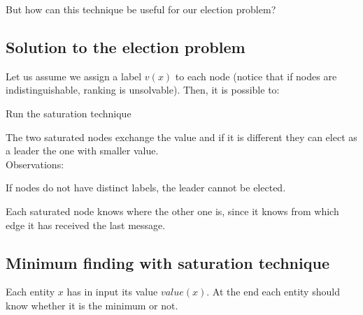 \documentclass[paper=a4, fontsize=11pt]{scrartcl} %
\numberwithin{equation}{section} %
\numberwithin{figure}{section} %
\numberwithin{table}{section} %
\begin{document}
But how can this technique be useful for our election problem?
~ \\

\subsection*{Solution to the election problem}
Let us assume we assign a label $v(x)$ to each node (notice that if nodes are indistinguishable, ranking is unsolvable). Then, it is possible to:
\begin{compactenum}
\item Run the saturation technique
\item The two saturated nodes exchange the value and if it is different they can elect as a leader the one with smaller value.\\
Observations:
\begin{compactitem}
	\item If nodes do not have distinct labels, the leader cannot be elected.
	\item Each saturated node knows where the other one is, since it knows from which edge it has received the last message.
\end{compactitem}
\end{compactenum}

\clearpage 
\subsection*{Minimum finding with saturation technique}
Each entity $x$ has in input its value $value(x)$. At the end each entity should know whether it is the minimum or not.\\
\end{document}
